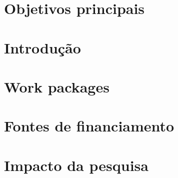 \documentclass[11pt,a4paper,oneside]{book}
\begin{document}
\section{Objetivos principais}

\section{Introdução}

\section{Work packages}

\newpage

\section{Fontes de financiamento}

\section{Impacto da pesquisa}

\backmatter


\end{document}
